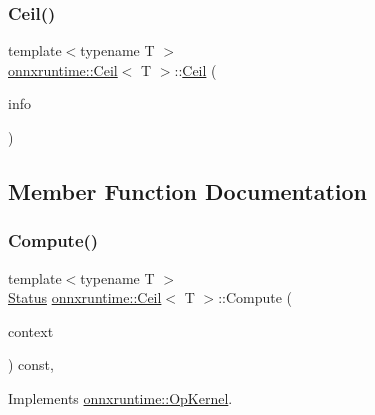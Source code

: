 \subsubsection{\texorpdfstring{Ceil()}{Ceil()}}
{\footnotesize\ttfamily template$<$typename T $>$ \\
\mbox{\hyperlink{classonnxruntime_1_1Ceil}{onnxruntime\+::\+Ceil}}$<$ T $>$\+::\mbox{\hyperlink{classonnxruntime_1_1Ceil}{Ceil}} (\begin{DoxyParamCaption}\item[{const \mbox{\hyperlink{classonnxruntime_1_1OpKernelInfo}{Op\+Kernel\+Info}} \&}]{info }\end{DoxyParamCaption})\hspace{0.3cm}{\ttfamily [inline]}}



\subsection{Member Function Documentation}
\mbox{\label{classonnxruntime_1_1Ceil_af14a32b94fd6b49f01aec57f81a38407}} 
\subsubsection{\texorpdfstring{Compute()}{Compute()}\hspace{0.1cm}{\footnotesize\ttfamily [1/2]}}
{\footnotesize\ttfamily template$<$typename T $>$ \\
\mbox{\hyperlink{classonnxruntime_1_1common_1_1Status}{Status}} \mbox{\hyperlink{classonnxruntime_1_1Ceil}{onnxruntime\+::\+Ceil}}$<$ T $>$\+::Compute (\begin{DoxyParamCaption}\item[{\mbox{\hyperlink{classonnxruntime_1_1OpKernelContext}{Op\+Kernel\+Context}} $\ast$}]{context }\end{DoxyParamCaption}) const\hspace{0.3cm}{\ttfamily [override]}, {\ttfamily [virtual]}}



Implements \mbox{\hyperlink{classonnxruntime_1_1OpKernel_a9eca8656a78b1b3ab9d3351a12798650}{onnxruntime\+::\+Op\+Kernel}}.

\mbox{\label{classonnxruntime_1_1Ceil_abe760048b39655fdc12476f4daed6478}} 
